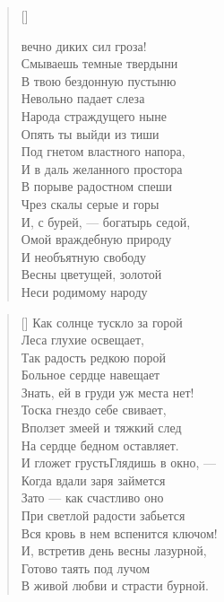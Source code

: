 \settowidth{\versewidth}{\vinТы вечно диких сил гроза!}
\begin{verse}[\versewidth]
\begin{patverse*}
 вечно диких сил гроза!\\
Смываешь темные твердыни\ldotst\\
В твою бездонную пустыню\\
Невольно падает слеза\\
Народа страждущего ныне\ldotst\\
Опять ты выйди из тиши\\
Под гнетом властного напора,\\
И в даль желанного простора\\
В порыве радостном спеши\\
Чрез скалы серые и горы\ldotst\\
И, с бурей, --- богатырь седой,\\
Омой враждебную природу\ldotst\\
И необъятную свободу\\
Весны цветущей, золотой\\
Неси родимому народу\ldotst
\end{patverse*}
\end{verse}

\newpage
\vspace*{-2cm}




\newpage
\vspace*{0cm}

\begin{verse}[\versewidth]
Как солнце тускло за горой\\
Леса глухие освещает,\\
Так радость редкою порой\\
Больное сердце навещает\ldotst\\
Знать, ей в груди уж места нет!\\
Тоска гнездо себе свивает,\\
Вползет змеей и тяжкий след\\
На сердце бедном оставляет.\\
И гложет грусть\ldotst Глядишь в окно, ---\\
Когда вдали заря займется\ldotsq\\
Зато --- как счастливо оно\\
При светлой радости забьется\ldotse\\
Вся кровь в нем вспенится ключом!\\
И, встретив день весны лазурной,\\
Готово таять под лучом\\
В живой любви и страсти бурной.
\end{verse}


